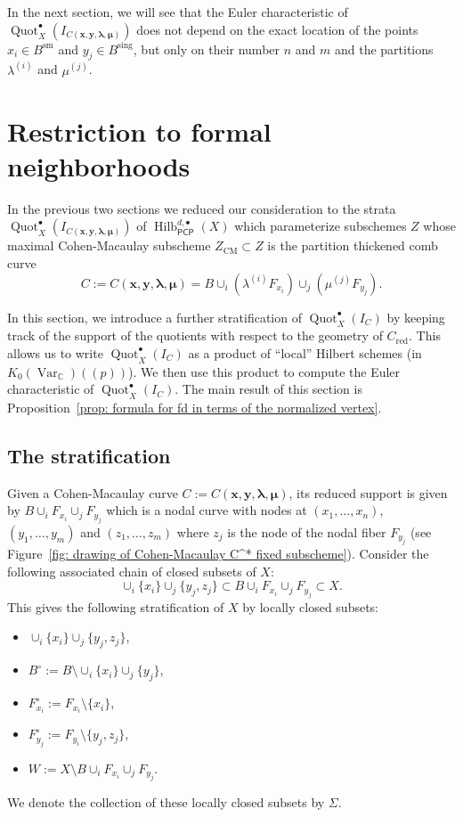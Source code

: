 \documentclass[12pt]{amsart}
\theoremstyle{definition}
\newcommand{\CC} {\mathbb{C}}          %
\newcommand{\Hilb}{\operatorname{Hilb}}
\newcommand{\Quot}{\operatorname{Quot}}
\newcommand{\CM}{\operatorname{CM}}
\newcommand{\Var}{\operatorname{Var}}
\newcommand{\sm}{\operatorname{sm}}
\newcommand{\sing}{\operatorname{sing}}
\newcommand{\boldx}{\boldsymbol{x}}
\newcommand{\boldy}{\boldsymbol{y}}
\newcommand{\boldlambda}{\boldsymbol{\lambda }}
\newcommand{\boldmu}{\boldsymbol{\mu }}
\newcommand{\PCP}{\mathsf{PCP}}
\newcommand{\red}{\mathrm{red}}
\newcommand{\presectionspace}{\vspace{0.2cm}} %
\begin{document}
In the next section, we will see that the Euler characteristic of
$\Quot_X^{\bullet}(I_{C(\boldx, \boldy, \boldlambda, \boldmu)})$ does not depend on the exact location of
the points $x_i \in B^{\sm}$ and $y_j \in B^{\sing}$, but only on
their number $n$ and $m$ and the partitions $\lambda^{(i)}$ and
$\mu^{(j)}$.



\presectionspace
\section{Restriction to formal neighborhoods} \label{sec: restriction
to formal nghds}

In the previous two sections we reduced our consideration to the
strata $\Quot_X^{\bullet}(I_{C(\boldx, \boldy, \boldlambda, \boldmu)})$
of $ \Hilb^{d,\bullet}_{\PCP }(X)$ which parameterize subschemes $Z$ whose maximal
Cohen-Macaulay subscheme $Z_{\CM} \subset Z$ is the partition
thickened comb curve 
\[
C:=C(\boldx, \boldy, \boldlambda, \boldmu)=B\cup_{i}(\lambda^{(i)}F_{x_{i}})\cup_{j}(\mu^{(j)}F_{y_{j}}).
\]

In this section, we introduce a further stratification of $\Quot_X^{\bullet}(I_{C})$ 
by keeping track of the support of the quotients with respect to the geometry of 
$C_{\red}$. This allows us to write $\Quot_X^{\bullet}(I_C)$ as a product 
of ``local'' Hilbert schemes (in $K_{0}(\Var_{\CC})(\!(p)\!)$). We then
use this product to compute the Euler characteristic of
$\Quot_X^{\bullet}(I_C)$. The main result of this section is
Proposition~\ref{prop: formula for fd in terms of the normalized
vertex}.


\subsection{The stratification}

Given a Cohen-Macaulay  curve $C:=C(\boldx, \boldy, \boldlambda, \boldmu)$, 
its reduced support is given by $B\cup_{i}F_{x_{i}}\cup_{j}F_{y_{j}}$
which is a nodal curve with nodes at $(x_{1},\dotsc ,x_{n})$,
$(y_{1},\dotsc ,y_{m})$ and $(z_{1},\dotsc ,z_{m})$ where $z_{j}$ is
the node of the nodal fiber $F_{y_{j}}$ (see Figure~\ref{fig: drawing
of Cohen-Macaulay C^* fixed subscheme}).
Consider the following associated chain of closed subsets of $X$:
\[
\cup_i \{x_i\} \cup_j \{y_j,z_j\} \subset B\cup_{i}F_{x_{i}}\cup_{j}F_{y_{j}} \subset X.
\]
This gives the following stratification of $X$ by locally closed subsets:
\begin{itemize}
\item $\cup_i \{x_i\} \cup_j \{y_j,z_j\}$,
\item $B^\circ := B \setminus \cup_i \{x_i\} \cup_j \{y_j\}$,
\item $F_{x_i}^{\circ} := F_{x_i} \setminus \{x_i\}$,
\item $F_{y_j}^{\circ} := F_{y_i} \setminus \{y_j,z_j\}$,
\item $W:=X \setminus B\cup_{i}F_{x_{i}}\cup_{j}F_{y_{j}}$.
\end{itemize}
We denote the collection of these locally closed subsets by $\Sigma$. 
\end{document}
